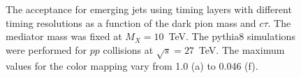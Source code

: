 \begin{figure}
\begin{center}

\end{center}
\caption{
The acceptance for emerging jets using timing layers with different timing resolutions as
a function of the dark pion mass and $c\tau$. The mediator mass was fixed at $M_X = 10$~TeV. The {\sc pythia}8 simulations were performed 
for $pp$ collisions at $\sqrt{s}=27$~TeV. 
The maximum values for 
the color mapping 
vary from  1.0 (a)  to  0.046 (f).     
}
\label{fig:efficiency}
\end{figure}

